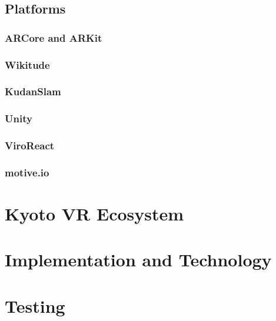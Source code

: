 \documentclass[a4paper, 10pt, american]{article}
\begin{document}
\lipsum[4-5]

\subsection{Platforms}
\label{sec:platforms}

\subsubsection{ARCore and ARKit}
\label{sec:ARCoreAndARKit}

\subsubsection{Wikitude}
\label{sec:wikitude}

\subsubsection{KudanSlam}
\label{sec:kudanSlam}

\subsubsection{Unity}
\label{sec:unity}

\subsubsection{ViroReact}
\label{sec:viroReact}

\subsubsection{motive.io}
\label{sec:motive.io}

\section{Kyoto VR Ecosystem}
\label{sec:KyotoVREcosystem}

\lipsum

\section{Implementation and Technology}
\label{sec:implementationAndTechnology}

\section{Testing}
\label{sec:testing}
\end{document}
